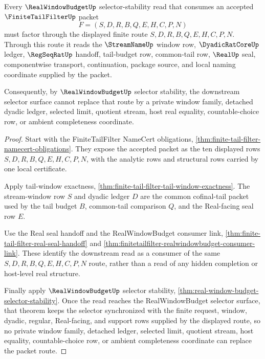 \begin{theorem}
\label{thm:finite-tail-filter-real-window-budget-selector-bridge}
Every $\RealWindowBudgetUp$ selector-stability read that consumes an accepted $\FiniteTailFilterUp$ packet
$$
F=(S,D,R,B,Q,E,H,C,P,N)
$$
must factor through the displayed finite route $S,D,R,B,Q,E,H,C,P,N$. Through this route it reads the $\StreamNameUp$ window row, $\DyadicRatCoreUp$ ledger, $\RegSeqRatUp$ handoff, tail-budget row, common-tail row, $\RealUp$ seal, componentwise transport, continuation, package source, and local naming coordinate supplied by the packet.

Consequently, by $\RealWindowBudgetUp$ selector stability, the downstream selector surface cannot replace that route by a private window family, detached dyadic ledger, selected limit, quotient stream, host real equality, countable-choice row, or ambient completeness coordinate.
\end{theorem}
\begin{proof}
Start with the FiniteTailFilter NameCert obligations, \autoref{thm:finite-tail-filter-namecert-obligations}. They expose the accepted packet as the ten displayed rows $S,D,R,B,Q,E,H,C,P,N$, with the analytic rows and structural rows carried by one local certificate.

Apply tail-window exactness, \autoref{thm:finite-tail-filter-tail-window-exactness}. The stream-window row $S$ and dyadic ledger $D$ are the common cofinal-tail packet used by the tail budget $B$, common-tail comparison $Q$, and the Real-facing seal row $E$.

Use the Real seal handoff and the RealWindowBudget consumer link, \autoref{thm:finite-tail-filter-real-seal-handoff} and \autoref{thm:finitetailfilter-realwindowbudget-consumer-link}. These identify the downstream read as a consumer of the same $S,D,R,B,Q,E,H,C,P,N$ route, rather than a read of any hidden completion or host-level real structure.

Finally apply $\RealWindowBudgetUp$ selector stability, \autoref{thm:real-window-budget-selector-stability}. Once the read reaches the RealWindowBudget selector surface, that theorem keeps the selector synchronized with the finite request, window, dyadic, regular, Real-facing, and support rows supplied by the displayed route, so no private window family, detached ledger, selected limit, quotient stream, host equality, countable-choice row, or ambient completeness coordinate can replace the packet route.
\end{proof}

